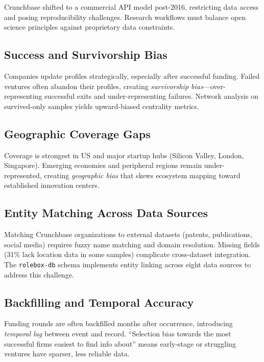 \documentclass[../main.tex]{subfiles}
\begin{document}
Crunchbase shifted to a commercial API model post-2016, restricting
data access and posing reproducibility challenges.
Research workflows must balance open science principles against
proprietary data constraints.

\subsection{Success and Survivorship Bias}

Companies update profiles strategically, especially after successful funding.
Failed ventures often abandon their profiles, creating
\emph{survivorship bias}---over-representing successful exits
and under-representing failures.\cite{kauffman2017crunchbase}
Network analysis on survived-only samples yields
upward-biased centrality metrics.

\subsection{Geographic Coverage Gaps}

Coverage is strongest in US and major startup hubs
(Silicon Valley, London, Singapore).
Emerging economies and peripheral regions remain under-represented,
creating \emph{geographic bias} that skews ecosystem mapping
toward established innovation centers.\cite{nathan2017crunchbase}

\subsection{Entity Matching Across Data Sources}

Matching Crunchbase organizations to external datasets (patents, publications,
social media) requires fuzzy name matching and domain resolution.
Missing fields (31\% lack location data in some samples) complicate
cross-dataset integration.\cite{nathan2017crunchbase}
The \texttt{rolebox-db} schema implements entity linking across
eight data sources to address this challenge.

\subsection{Backfilling and Temporal Accuracy}

Funding rounds are often backfilled months after occurrence,
introducing \emph{temporal lag} between event and record.
``Selection bias towards the most successful firms easiest to find info about''
means early-stage or struggling ventures have sparser, less reliable data.%
\cite{kauffman2017crunchbase}
\end{document}
